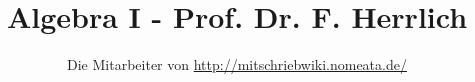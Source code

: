 \documentclass[a4paper,10pt,german]{scrbook}
\title{Algebra I - Prof. Dr. F. Herrlich}
\author{Die Mitarbeiter von \url{http://mitschriebwiki.nomeata.de/}}
\theoremstyle{saetze}
\theoremstyle{definitionen}
\begin{document}



\newcommand{\emp}[1]{\textbf{\emph{#1\index{#1}}}}
\newcommand{\empind}[2]{\textbf{\emph{#1\index{#2}}}}

\newenvironment{define}
    { \begin{flushleft} \begin{description} }
    { \end{description} \end{flushleft} }

\newenvironment{enum} {
      \begin{enumerate}
      \renewcommand{\labelenumi}{(\alph{enumi})}

      }
      { \end{enumerate} }

\newcommand{\bla}[0]
{\begin{tiny} $\left\{
\begin{array}{l}
             . \\
             . \\
             . \end{array}
        \right\}$
\end{tiny}}

\newcommand{\blab}[0]
{\begin{tiny} $\left\{
\begin{array}{l}
             Halbgruppen \\
             Monoiden \\
             Gruppen \end{array}
        \right\}$
\end{tiny}}


\newenvironment{ourshaded}{%
  \def\FrameCommand{\colorbox{shadecolor}}%
  \edef\frmlw{\linewidth}%
  \MakeFramed{\setlength\hsize{\linewidth}\FrameRestore}%
  \setlength{\parskip}{1em}\setlength{\parindent}{0pt}}{\endMakeFramed}

\newcommand{\bew}[2]
{\definecolor{shadecolor}{rgb}{0.85,0.85,1}
 \begin{shaded}
 \textit{\textbf{Beweis: }}
 #1
 \begin{enum} #2
 \hfill \rule{2,1mm}{2,1mm} \end{enum}
 \end{shaded}
}
\end{document}
